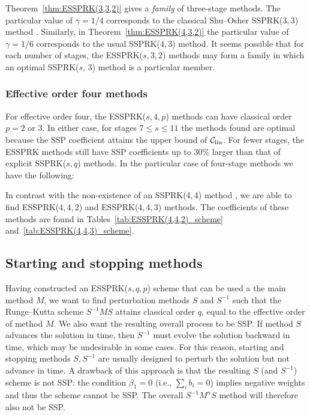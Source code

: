 Theorem~\ref{thm:ESSPRK(3,3,2)} gives a \emph{family} of three-stage 
methods. 
The particular value of $\gamma = 1/4$ corresponds to the classical
Shu--Osher SSPRK($3,3$) method \cite{Gottlieb/Shu:1998}.
Similarly, in Theorem~\ref{thm:ESSPRK(4,3,2)} the particular value of 
$\gamma = 1/6$ corresponds to the usual SSPRK($4,3$) method.
It seems possible that for each number of stages, the 
ESSPRK($s, 3, 2$) methods may form a family in which an optimal 
SSPRK($s$, $3$) method is a particular member. 

\subsubsection{Effective order four methods}\label{subsubsec:4th_ESSPRK}
For effective order four, the ESSPRK($s,4,p$) methods can have
classical order $p=2$ or $3$.
In either case, for stages $7 \le s \le 11$ the methods found are
optimal because the SSP coefficient attains the upper bound of
$\mathcal{C}_{\text{lin}}$.
For fewer stages, the ESSPRK methods still have SSP coefficients up to
30\% larger than that of explicit SSPRK($s,q$) methods.
In the particular case of four-stage methods we have the following:%
\begin{remark}
	In contrast with the non-existence of an SSPRK(4,\,4) method 
	\cite{Gottlieb/Shu:1998,Ruuth2002}, 
	we are able to find ESSPRK(4,\,4,\,2) and ESSPRK(4,\,4,\,3) methods.
	The coefficients of these methods are found in
	Tables~\ref{tab:ESSPRK(4,4,2)_scheme}
	and~\ref{tab:ESSPRK(4,4,3)_scheme}.
\end{remark}

\subsection{Starting and stopping methods}\label{subsec:starting_stopping}
Having constructed an ESSPRK($s,q,p$) scheme that can be used a the main 
method $M$, we want to find perturbation methods $S$ and $S^{-1}$ such that the 
Runge--Kutta scheme $S^{-1}MS$ attains classical order $q$, equal to the 
effective order of method $M$.
We also want the resulting overall process to be SSP.
If method $S$ advances the solution in time, then $S^{-1}$ must evolve the 
solution backward in time, which may be undesirable in some cases. 
For this reason, starting and stopping methods $S, S^{-1}$ are usually 
designed to perturb the solution but not advance in time. 
A drawback of this approach is that the resulting $S$ (and $S^{-1}$) scheme 
is not SSP:
the condition $\beta_1 = 0$ (i.e., $\sum_i b_i = 0$) implies negative
weights and thus the scheme cannot be SSP.
The overall $S^{-1}M^nS$ method will therefore also not be SSP.


